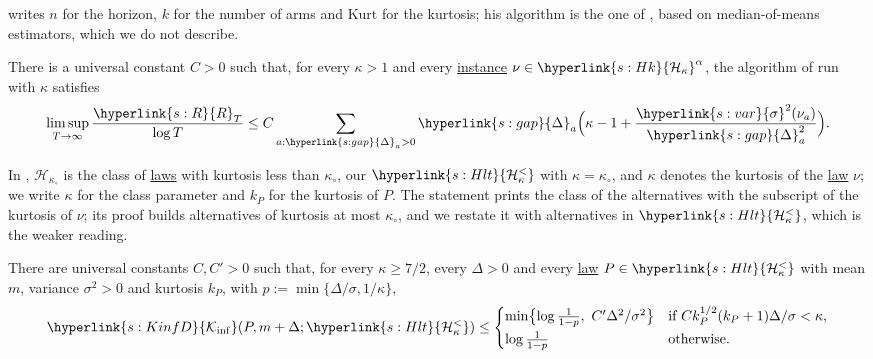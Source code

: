 \documentclass[11pt]{article}
\newcommand{\sy}[2]{{\hyperlink{#1}{#2}}}
\newcommand{\term}[2]{\hyperlink{#1}{#2}}
\newcommand{\sd}{\sy{s:var}{\sigma}}
\newcommand{\gap}{\sy{s:gap}{\Delta}}
\newcommand{\Kinf}{\sy{s:KinfD}{\mathcal{K}_{\inf}}}
\newcommand{\Hk}{\sy{s:Hk}{\mathcal{H}_{\kappa}}}
\newcommand{\Hlt}{\sy{s:Hlt}{\mathcal{H}^{<}_{\kappa}}}
\newcommand{\Reg}{\sy{s:R}{R}}
\begin{document}
\citet{L17} writes $n$ for the horizon, $k$ for the number of arms and $\mathrm{Kurt}$ for the kurtosis; his
algorithm is the one of \citet[Section~2]{L17}, based on median-of-means estimators, which we do not
describe.

\begin{lemma}\label{cite:L17-thm2}
There is a universal constant $C>0$ such that, for every $\kappa>1$ and every \term{w:instance}{instance} $\nu\in\Hk^\alpha$, the
algorithm of \citet[Section~2]{L17} run with $\kappa$ satisfies
\begin{equation*}
  \limsup_{T\to\infty}\frac{\Reg_T}{\log T}\le C\sum_{a:\gap_a>0}\gap_a\Bigl(\kappa-1+\frac{\sd^2(\nu_a)}{\gap_a^2}\Bigr).
\end{equation*}
\end{lemma}

In \citet[Theorem~9]{L17}, $\mathcal H_{\kappa_\circ}$ is the class of \term{w:law}{laws} with kurtosis less than $\kappa_\circ$, our
$\Hlt$ with $\kappa=\kappa_\circ$, and $\kappa$ denotes the kurtosis of the \term{w:law}{law} $\nu$; we write $\kappa$ for the class
parameter and $k_P$ for the kurtosis of $P$. The statement prints the class of the alternatives with the
subscript of the kurtosis of $\nu$; its proof \citep[Appendix~A]{L17} builds alternatives of kurtosis at
most $\kappa_\circ$, and we restate it with alternatives in $\Hlt$, which is the weaker reading.

\begin{lemma}\label{cite:L17-thm9}
There are universal constants $C,C'>0$ such that, for every $\kappa\ge7/2$, every $\Delta>0$ and every \term{w:law}{law}
$P\in\Hlt$ with mean $m$, variance $\sigma^2>0$ and kurtosis $k_P$, with $p:=\min\{\Delta/\sigma,1/\kappa\}$,
\begin{equation*}
  \Kinf(P,m+\Delta;\Hlt)\le
  \begin{cases}
    \min\bigl\{\log\frac1{1-p},\ C'\Delta^2/\sigma^2\bigr\} & \text{if } Ck_P^{1/2}(k_P+1)\Delta/\sigma<\kappa,\\[2pt]
    \log\frac1{1-p} & \text{otherwise.}
  \end{cases}
\end{equation*}
\end{lemma}
\end{document}
